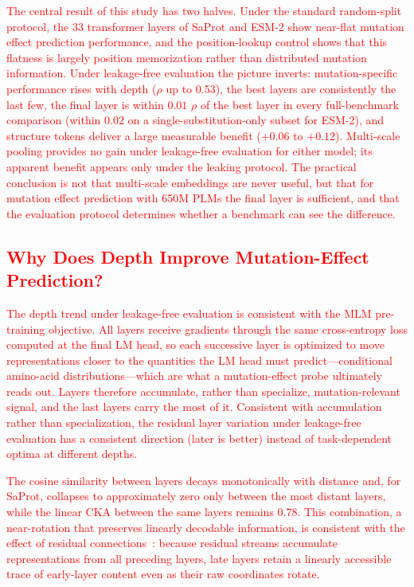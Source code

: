\documentclass[numbered,webpdf,modern,large]{oup-authoring-template}
\newcommand{\rev}[1]{\textcolor{red}{#1}}
\begin{document}
\rev{The central result of this study has two halves. Under the standard
random-split protocol, the 33 transformer layers of SaProt and ESM-2 show
near-flat mutation effect prediction performance, and the position-lookup
control shows that this flatness is largely position memorization rather than
distributed mutation information. Under leakage-free evaluation the picture
inverts: mutation-specific performance rises with depth ($\rho$ up to 0.53),
the best layers are consistently the last few, the final layer is within
$0.01$ $\rho$ of the best layer in every full-benchmark comparison (within
$0.02$ on a single-substitution-only subset for ESM-2), and structure
tokens deliver a large measurable benefit ($+0.06$ to $+0.12$). Multi-scale
pooling provides no gain under leakage-free evaluation for either model; its
apparent benefit appears only under the leaking protocol. The practical
conclusion is not that multi-scale embeddings are never useful, but that for
mutation effect prediction with 650M PLMs the final layer is sufficient, and
that the evaluation protocol determines whether a benchmark can see the
difference.}

\subsection{\rev{Why Does Depth Improve Mutation-Effect Prediction?}}

\rev{The depth trend under leakage-free evaluation is consistent with the MLM
pre-training objective. All layers receive gradients through the same
cross-entropy loss computed at the final LM head, so each successive layer is
optimized to move representations closer to the quantities the LM head must
predict---conditional amino-acid distributions---which are what a
mutation-effect probe ultimately reads out. Layers therefore accumulate,
rather than specialize, mutation-relevant signal, and the last layers carry
the most of it. Consistent with accumulation rather than specialization, the
residual layer variation under leakage-free evaluation has a consistent
direction (later is better) instead of task-dependent optima at different
depths.}

\rev{The cosine similarity between layers decays monotonically with distance and,
for SaProt, collapses to approximately zero only between the most distant layers,
while the linear CKA between the same layers remains 0.78. This combination, a
near-rotation that preserves linearly decodable information, is consistent with the
effect of residual connections~\cite{he2016deep}: because residual streams accumulate
representations from all preceding layers, late layers retain a linearly accessible
trace of early-layer content even as their raw coordinates rotate.}
\end{document}
